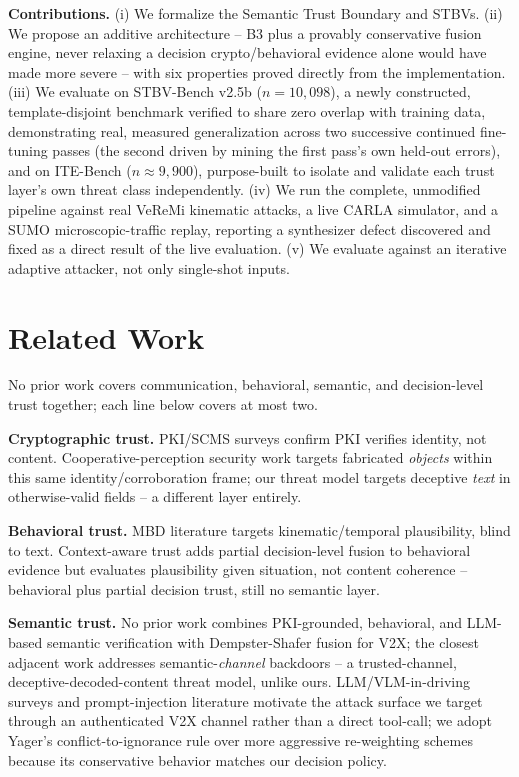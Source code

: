 \documentclass[conference]{IEEEtran}
\begin{document}
\textbf{Contributions.} (i) We formalize the Semantic Trust Boundary and STBVs. (ii) We propose an additive architecture -- B3 plus a provably conservative fusion engine, never relaxing a decision crypto/behavioral evidence alone would have made more severe -- with six properties proved directly from the implementation. (iii) We evaluate on STBV-Bench v2.5b ($n{=}10{,}098$), a newly constructed, template-disjoint benchmark verified to share zero overlap with training data, demonstrating real, measured generalization across two successive continued fine-tuning passes (the second driven by mining the first pass's own held-out errors), and on ITE-Bench ($n{\approx}9{,}900$), purpose-built to isolate and validate each trust layer's own threat class independently. (iv) We run the complete, unmodified pipeline against real VeReMi kinematic attacks, a live CARLA simulator, and a SUMO microscopic-traffic replay, reporting a synthesizer defect discovered and fixed as a direct result of the live evaluation. (v) We evaluate against an iterative adaptive attacker, not only single-shot inputs.

\section{Related Work}
\label{sec:related}
No prior work covers communication, behavioral, semantic, and decision-level trust together; each line below covers at most two.

\textbf{Cryptographic trust.} PKI/SCMS surveys \cite{r_pki_survey,r_pki_compare} confirm PKI verifies identity, not content. Cooperative-perception security work \cite{r_cp_fabrication} targets fabricated \emph{objects} within this same identity/corroboration frame; our threat model targets deceptive \emph{text} in otherwise-valid fields -- a different layer entirely.

\textbf{Behavioral trust.} MBD literature \cite{r_mbd_survey1,r_mbd_survey2} targets kinematic/temporal plausibility, blind to text. Context-aware trust \cite{r_context_aware,r_cares} adds partial decision-level fusion to behavioral evidence but evaluates plausibility given situation, not content coherence -- behavioral plus partial decision trust, still no semantic layer.

\textbf{Semantic trust.} No prior work combines PKI-grounded, behavioral, and LLM-based semantic verification with Dempster-Shafer fusion for V2X; the closest adjacent work addresses semantic-\emph{channel} backdoors \cite{r_semcom_backdoor} -- a trusted-channel, deceptive-decoded-content threat model, unlike ours. LLM/VLM-in-driving surveys \cite{r_llm4drive,r_llm_survey} and prompt-injection literature \cite{r_prompt_robot,r_prompt_vla} motivate the attack surface we target through an authenticated V2X channel rather than a direct tool-call; we adopt Yager's conflict-to-ignorance rule \cite{r_ds_improved1,r_ds_improved2} over more aggressive re-weighting schemes because its conservative behavior matches our decision policy.
\end{document}
